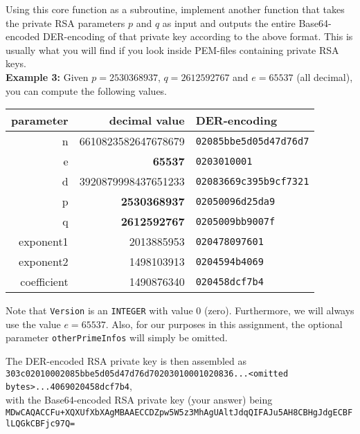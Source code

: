 \documentclass{article}
\begin{document}
\begin{description}
{				Using this core function as a subroutine, implement another function that takes the private RSA parameters $p$ and $q$ as input and outputs the entire Base64-encoded DER-encoding of that private key according to the above format. This is usually what you will find if you look inside PEM-files containing private RSA keys.\\
				
				\textbf{Example 3:} Given $p=2530368937$, $q=2612592767$ and $e=65537$ (all decimal), you can compute the following values.\\
				\begin{center}
					\begin{tabular}{rrl}
						parameter & decimal value & DER-encoding\\\hline
						n & 6610823582647678679 & \verb!02085bbe5d05d47d76d7!\\
						e & \textbf{65537} & \verb!0203010001!\\
						d & 3920879998437651233 & \verb!02083669c395b9cf7321!\\
						p & \textbf{2530368937} & \verb!02050096d25da9!\\
						q & \textbf{2612592767} & \verb!0205009bb9007f!\\
						exponent1 & 2013885953 & \verb!020478097601!\\
						exponent2 & 1498103913 & \verb!0204594b4069!\\
						coefficient & 1490876340 & \verb!020458dcf7b4!
					\end{tabular}
				\end{center}
				
				Note that \verb!Version! is an \verb!INTEGER! with value $0$ (zero). Furthermore, we will always use the value $e=65537$. Also, for our purposes in this assignment, the optional parameter \verb!otherPrimeInfos! will simply be omitted.
				
				The DER-encoded RSA private key is then assembled as\\
				
				\verb!303c02010002085bbe5d05d47d76d70203010001020836...<omitted bytes>...4069020458dcf7b4!,\\
				
				with the Base64-encoded RSA private key (your answer) being\\
				
				\verb!MDwCAQACCFu+XQXUfXbXAgMBAAECCDZpw5W5z3MhAgUAltJdqQIFAJu5AH8CBHgJdgECBFlLQGkCBFjc97Q=!\\
				
}
\end{description}
\end{document}
